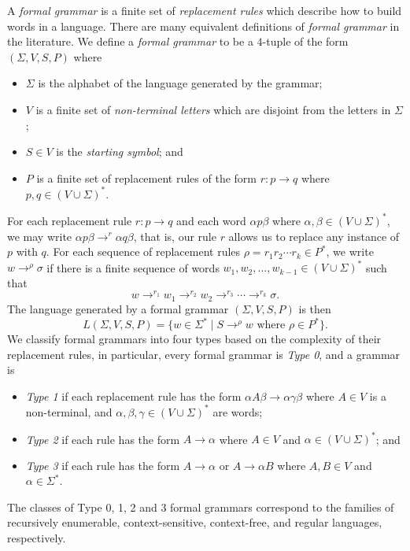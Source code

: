 A \emph{formal grammar} is a finite set of \emph{replacement rules} which describe how to build words in a language.
There are many equivalent definitions of \emph{formal grammar} in the literature.
We define a \emph{formal grammar} to be a $4$-tuple of the form $(\Sigma, V, S, P)$ where
\begin{itemize}
	\item $\Sigma$ is the alphabet of the language generated by the grammar;
	\item $V$ is a finite set of \emph{non-terminal letters} which are disjoint from the letters in $\Sigma$;
	\item $S \in V$ is the \emph{starting symbol}; and
	\item $P$ is a finite set of replacement rules of the form $r \colon p \to q$ where $p,q \in (V \cup \Sigma)^*$.
\end{itemize}
For each replacement rule $r \colon p \to q$ and each word $\alpha p \beta$ where $\alpha,\beta \in (V \cup \Sigma)^*$, we may write $\alpha p \beta \to^r \alpha q \beta$, that is, our rule $r$ allows us to replace any instance of $p$ with $q$.
For each sequence of replacement rules $\rho = r_1 r_2 \cdots r_k \in P^*$, we write $w \to^{\rho} \sigma$ if there is a finite sequence of words $w_1,w_2,\ldots,w_{k-1} \in (V \cup \Sigma)^*$ such that
\[
	w \to^{r_1} w_1 \to^{r_2} w_2 \to^{r_3} \cdots \to^{r_k} \sigma.
\]
The language generated by a formal grammar $(\Sigma,V,S,P)$ is then
\[
	L(\Sigma,V,S,P)
	=
	\{
		w \in \Sigma^*
	\mid
		S \to^{\rho} w
		\text{ where }
		\rho \in P^*
	\}.
\]
We classify formal grammars into four types based on the complexity of their replacement rules, in particular, every formal grammar is \emph{Type 0}, and a grammar is
\begin{itemize}
	\item \emph{Type 1} if each replacement rule has the form $\alpha A \beta \to \alpha \gamma \beta$ where $A \in V$ is a non-terminal, and $\alpha,\beta,\gamma \in (V \cup \Sigma)^*$ are words;
	\item \emph{Type 2} if each rule has the form $A \to \alpha$ where $A \in V$ and $\alpha \in (V \cup \Sigma)^*$; and
	\item \emph{Type 3} if each rule has the form $A \to \alpha$ or $A \to \alpha B$ where $A,B \in V$ and $\alpha \in \Sigma^*$.
\end{itemize}
The classes of Type 0, 1, 2 and 3 formal grammars correspond to the families of recursively enumerable, context-sensitive, context-free, and regular languages, respectively.

